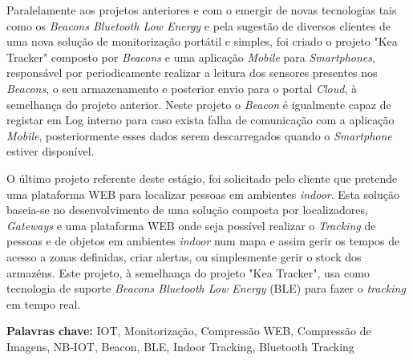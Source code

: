 \par Paralelamente aos projetos anteriores e com o emergir de novas tecnologias tais como os \textit{Beacons Bluetooth Low Energy} e pela sugestão de diversos clientes de uma nova solução de monitorização portátil e simples, foi criado o projeto "Kea Tracker" composto por \textit{Beacons} e uma aplicação \textit{Mobile} para \textit{Smartphones}, responsável por periodicamente realizar a leitura dos sensores presentes nos \textit{Beacons}, o seu armazenamento e posterior envio para o portal \textit{Cloud}, à semelhança do projeto anterior. Neste projeto o \textit{Beacon} é igualmente capaz de registar em Log interno para caso exista falha de comunicação com a aplicação \textit{Mobile}, posteriormente esses dados serem descarregados quando o \textit{Smartphone} estiver disponível.

\par O último projeto referente deste estágio, foi solicitado pelo cliente que pretende uma plataforma WEB para localizar pessoas em ambientes \textit{indoor}. Esta solução baseia-se no desenvolvimento de uma solução composta por localizadores, \textit{Gateways} e uma plataforma WEB onde seja possível realizar o \textit{Tracking} de pessoas e de objetos em ambientes \textit{indoor} num mapa e assim gerir os tempos de acesso a zonas definidas, criar alertas, ou simplesmente gerir o stock dos armazéns. Este projeto, à semelhança do projeto "Kea Tracker", usa como tecnologia de suporte \textit{Beacons Bluetooth Low Energy} (BLE) para fazer o \textit{tracking} em tempo real.




\bigskip

\textbf{Palavras chave:}
IOT, Monitorização, Compressão WEB, Compressão de Imagens, NB-IOT, Beacon, BLE, Indoor Tracking, Bluetooth Tracking